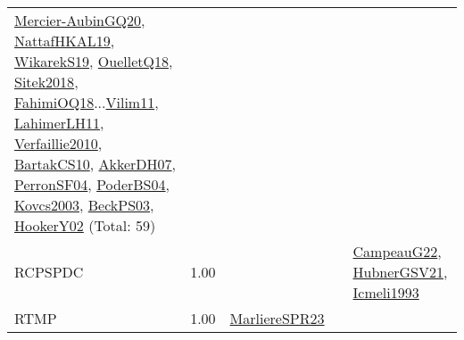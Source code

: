 {\begin{longtable}{p{3cm}r>{\raggedright\arraybackslash}p{6cm}>{\raggedright\arraybackslash}p{6cm}>{\raggedright\arraybackslash}p{8cm}}
\hyperref[detail:Mercier-AubinGQ20]{Mercier-AubinGQ20}, \hyperref[detail:NattafHKAL19]{NattafHKAL19}, \hyperref[detail:WikarekS19]{WikarekS19}, \hyperref[detail:OuelletQ18]{OuelletQ18}, \hyperref[detail:Sitek2018]{Sitek2018}, \hyperref[detail:FahimiOQ18]{FahimiOQ18}...\hyperref[detail:Vilim11]{Vilim11}, \hyperref[detail:LahimerLH11]{LahimerLH11}, \hyperref[detail:Verfaillie2010]{Verfaillie2010}, \hyperref[detail:BartakCS10]{BartakCS10}, \hyperref[detail:AkkerDH07]{AkkerDH07}, \hyperref[detail:PerronSF04]{PerronSF04}, \hyperref[detail:PoderBS04]{PoderBS04}, \hyperref[detail:Kovcs2003]{Kovcs2003}, \hyperref[detail:BeckPS03]{BeckPS03}, \hyperref[detail:HookerY02]{HookerY02} (Total: 59)\\
\index{RCPSPDC}\index{Classification!RCPSPDC}RCPSPDC &  1.00 &  &  & \hyperref[detail:CampeauG22]{CampeauG22}, \hyperref[detail:HubnerGSV21]{HubnerGSV21}, \hyperref[detail:Icmeli1993]{Icmeli1993}\\
\index{RTMP}\index{Classification!RTMP}RTMP &  1.00 & \hyperref[detail:MarliereSPR23]{MarliereSPR23} &  & \\

\end{longtable}}
